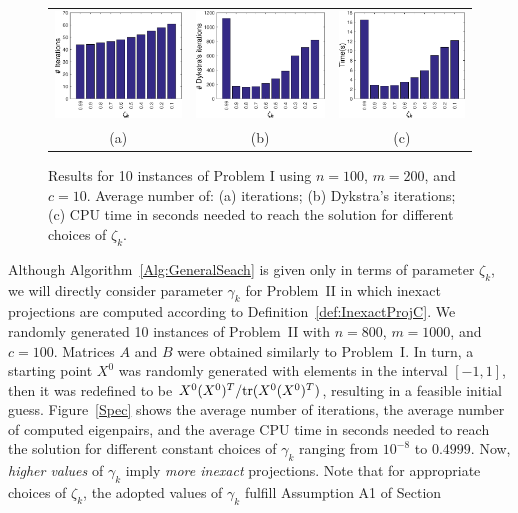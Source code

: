 \begin{figure}[H]\centering
	\begin{tabular}{ccc}
		\includegraphics[scale=\myscale]{figures/SDDit} & \includegraphics[scale=\myscale]{figures/SDDDIT} & \includegraphics[scale=\myscale]{figures/SDDtime} \\
		(a)                                             & (b)                                              & (c)                                               \\
	\end{tabular}
	\caption[Results for 10 instances of Problem I]{Results for 10 instances of Problem I using $n=100$, $m=200$, and $c=10$. Average number of: (a) iterations; (b) Dykstra’s iterations; (c)  CPU time in seconds needed to reach the solution for different choices of $\zeta_k$.}
	\label{SDD}
\end{figure}

Although Algorithm~\ref{Alg:GeneralSeach} is given only in terms of parameter $\zeta_k$, we will directly consider parameter $\gamma_k$ for Problem~II in which inexact projections are computed according to Definition~\ref{def:InexactProjC}. We randomly generated 10 instances of Problem~II with $n=800$, $m=1000$, and $c=100$. Matrices $A$ and $B$ were obtained similarly to Problem~I. In turn, a starting point $X^0$ was randomly generated with elements in the interval $[-1,1]$, then it was redefined to be $X^0  (X^0)^T/\textrm{tr}(X^0  (X^0)^T)$, resulting in a feasible initial guess.
Figure~\ref{Spec} shows the average number of iterations,  the average number of computed eigenpairs, and the average  CPU time in seconds needed to reach the solution for different constant choices of $\gamma_k$ ranging from $10^{-8}$ to $0.4999$. Now, {\it higher values} of $\gamma_k$ imply {\it more inexact} projections. Note that for appropriate choices of $\zeta_k$, the adopted values of $\gamma_k$ fulfill Assumption A1 of Section